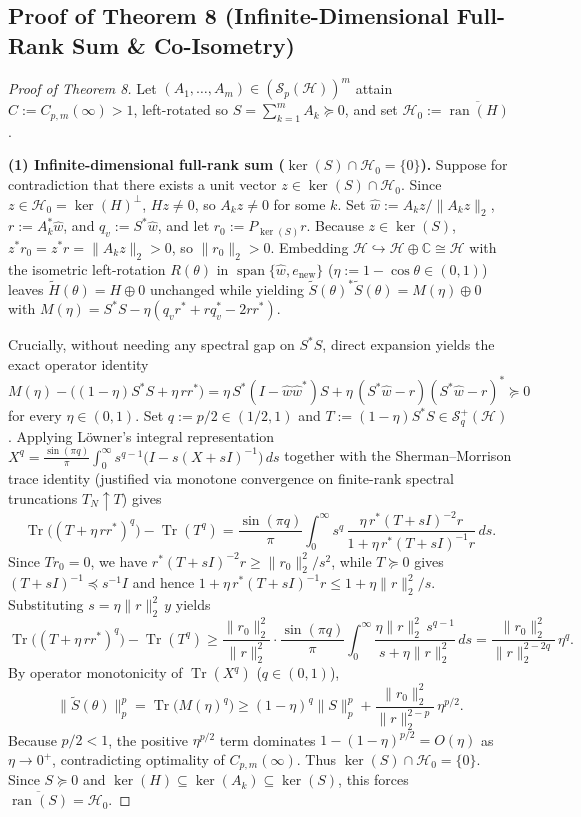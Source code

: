 \documentclass[10pt,letterpaper]{article}
\newcommand{\C}{\mathbb{C}}
\newcommand{\Hilb}{\mathcal{H}}
\newcommand{\Sp}{\mathcal{S}_p}
\newcommand{\Tr}{\operatorname{Tr}}
\newcommand{\ran}{\operatorname{ran}}
\begin{document}
\subsection{Proof of Theorem 8 (Infinite-Dimensional Full-Rank Sum \& Co-Isometry)}

\begin{proof}[Proof of Theorem 8]
Let $(A_1,\dots,A_m) \in (\Sp(\Hilb))^m$ attain $C := C_{p,m}(\infty) > 1$, left-rotated so $S = \sum_{k=1}^m A_k \succeq 0$, and set $\Hilb_0 := \overline{\ran(H)}$.

\textbf{(1) Infinite-dimensional full-rank sum ($\ker(S) \cap \Hilb_0 = \{0\}$).}
Suppose for contradiction that there exists a unit vector $z \in \ker(S) \cap \Hilb_0$. Since $z \in \Hilb_0 = \ker(H)^\perp$, $Hz \neq 0$, so $A_k z \neq 0$ for some $k$. Set $\hat{w} := A_k z / \|A_k z\|_2$, $r := A_k^* \hat{w}$, and $q_v := S^* \hat{w}$, and let $r_0 := P_{\ker(S)} r$. Because $z \in \ker(S)$, $z^* r_0 = z^* r = \|A_k z\|_2 > 0$, so $\|r_0\|_2 > 0$. Embedding $\Hilb \hookrightarrow \Hilb \oplus \C \cong \Hilb$ with the isometric left-rotation $R(\theta)$ in $\operatorname{span}\{\hat{w}, e_{\mathrm{new}}\}$ ($\eta := 1 - \cos\theta \in (0,1)$) leaves $\widetilde{H}(\theta) = H \oplus 0$ unchanged while yielding $\widetilde{S}(\theta)^* \widetilde{S}(\theta) = M(\eta) \oplus 0$ with $M(\eta) = S^* S - \eta(q_v r^* + r q_v^* - 2 r r^*)$.

Crucially, without needing any spectral gap on $S^* S$, direct expansion yields the exact operator identity
\[
  M(\eta) - \bigl((1 - \eta) S^* S + \eta\, r r^*\bigr)
  = \eta\, S^*(I - \hat{w}\hat{w}^*) S + \eta\,(S^*\hat{w} - r)(S^*\hat{w} - r)^* \succeq 0
\]
for every $\eta \in (0,1)$. Set $q := p/2 \in (1/2, 1)$ and $T := (1 - \eta) S^* S \in \mathcal{S}_q^+(\Hilb)$. Applying L\"owner's integral representation $X^q = \frac{\sin(\pi q)}{\pi}\int_0^\infty s^{q-1}\bigl(I - s(X+sI)^{-1}\bigr)\,ds$ together with the Sherman--Morrison trace identity (justified via monotone convergence on finite-rank spectral truncations $T_N \uparrow T$) gives
\[
  \Tr\bigl((T + \eta\, r r^*)^q\bigr) - \Tr(T^q)
  = \frac{\sin(\pi q)}{\pi}\int_0^\infty s^q\,\frac{\eta\, r^*(T + sI)^{-2} r}{1 + \eta\, r^*(T + sI)^{-1} r}\,ds.
\]
Since $T r_0 = 0$, we have $r^*(T + sI)^{-2} r \ge \|r_0\|_2^2 / s^2$, while $T \succeq 0$ gives $(T + sI)^{-1} \preceq s^{-1} I$ and hence $1 + \eta\, r^*(T + sI)^{-1} r \le 1 + \eta\|r\|_2^2 / s$. Substituting $s = \eta\|r\|_2^2\, y$ yields
\[
  \Tr\bigl((T + \eta\, r r^*)^q\bigr) - \Tr(T^q)
  \ge \frac{\|r_0\|_2^2}{\|r\|_2^2}\cdot \frac{\sin(\pi q)}{\pi}\int_0^\infty \frac{\eta\|r\|_2^2\, s^{q-1}}{s + \eta\|r\|_2^2}\,ds
  = \frac{\|r_0\|_2^2}{\|r\|_2^{2 - 2q}}\,\eta^q.
\]
By operator monotonicity of $\Tr(X^q)$ ($q \in (0, 1)$),
\[
  \|\widetilde{S}(\theta)\|_p^p = \Tr\bigl(M(\eta)^q\bigr)
  \ge (1 - \eta)^q \|S\|_p^p + \frac{\|r_0\|_2^2}{\|r\|_2^{2 - p}}\,\eta^{p/2}.
\]
Because $p/2 < 1$, the positive $\eta^{p/2}$ term dominates $1 - (1-\eta)^{p/2} = O(\eta)$ as $\eta \to 0^+$, contradicting optimality of $C_{p,m}(\infty)$. Thus $\ker(S) \cap \Hilb_0 = \{0\}$. Since $S \succeq 0$ and $\ker(H) \subseteq \ker(A_k) \subseteq \ker(S)$, this forces $\overline{\ran(S)} = \Hilb_0$.


\end{proof}
\end{document}
